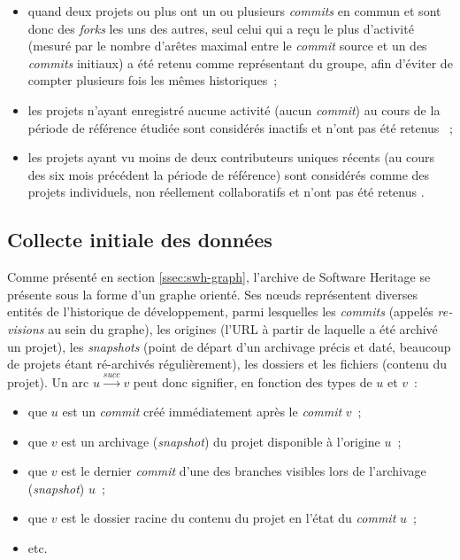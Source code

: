 \documentclass[dvipsnames]{llncs}
\newcommand{\en}[1]{\foreignlanguage{english}{\emph{#1}}}
\begin{document}
    \begin{itemize}
        \item quand deux projets ou plus ont un ou plusieurs \en{commits} en commun et sont donc des
            \en{forks} les uns des autres, seul celui qui a reçu le plus d'activité (mesuré par le nombre
            d'arêtes maximal entre le \en{commit} source et un des \en{commits} initiaux) a été retenu comme
            représentant du groupe, afin d'éviter de compter plusieurs fois les mêmes historiques ;
        \item les projets n'ayant enregistré aucune activité (aucun \en{commit}) au cours de la période de
            référence étudiée sont considérés inactifs et n'ont pas été retenus
            \parencite[voir][]{mining-github-2014} ;
        \item les projets ayant vu moins de deux contributeurs uniques récents (au cours des six mois
            précédent la période de référence) sont considérés comme des projets individuels, non réellement
            collaboratifs et n'ont pas été retenus \parencite[voir][]{mining-github-2014}.
    \end{itemize}

    \subsection{Collecte initiale des données}

    Comme présenté en section \ref{ssec:swh-graph}, l'archive de Software Heritage se présente sous la forme
    d'un graphe orienté. Ses nœuds représentent diverses entités de l'historique de développement, parmi
    lesquelles les \en{commits} (appelés \en{revisions} au sein du graphe), les origines (l'URL à partir de
    laquelle a été archivé un projet), les \en{snapshots} (point de départ d'un archivage précis et daté,
    beaucoup de projets étant ré-archivés régulièrement), les dossiers et les fichiers (contenu du projet). Un
    arc $u \xrightarrow{succ} v$ peut donc signifier, en fonction des types de $u$ et $v$ : 

    \begin{itemize}
        \item que $u$ est un \en{commit} créé immédiatement après le \en{commit} $v$ ;
        \item que $v$ est un archivage (\en{snapshot}) du projet disponible à l'origine $u$ ;
        \item que $v$ est le dernier \en{commit} d'une des branches visibles lors de l'archivage
            (\en{snapshot}) $u$ ;
        \item que $v$ est le dossier racine du contenu du projet en l'état du \en{commit} $u$ ;
        \item etc.
    \end{itemize}
\end{document}

